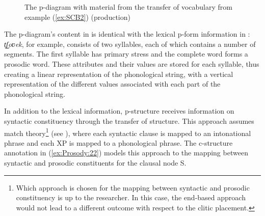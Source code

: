 \documentclass[output=paper,hidelinks]{langscibook}
\begin{document}
\begin{figure}
\centering
{\small 
{}
}
\caption{The p-diagram with material from the transfer of vocabulary from example (\ref{ex:SCB2}) (production)}
\label{fig:p-diagram_lex}
\end{figure}

The p-diagram's content in  is identical with the lexical p-form information in : {\em t͜ʃo{ʋ}ek}, for example, consists of two syllables, each of which contains a number of segments. The first syllable has primary stress and the complete word forms a prosodic word. These attributes and their values are stored for each syllable, thus creating a linear representation of the phonological string, with a vertical representation of the different values associated with each part of the phonological string.

In addition to the lexical information, p-structure receives information on syntactic constituency through the  transfer of structure. This approach assumes match theory\footnote{Which approach is chosen for the mapping between syntactic and prosodic constituency is up to the researcher. In this case, the end-based approach would not lead to a different outcome with respect to the clitic placement.} (see ), where each syntactic clause is mapped to an intonational phrase and each XP is mapped to a phonological phrase. The c-structure annotation in (\ref{ex:Prosody:22}) models this approach to the mapping between syntactic and prosodic constituents for the clausal node S.
\end{document}
